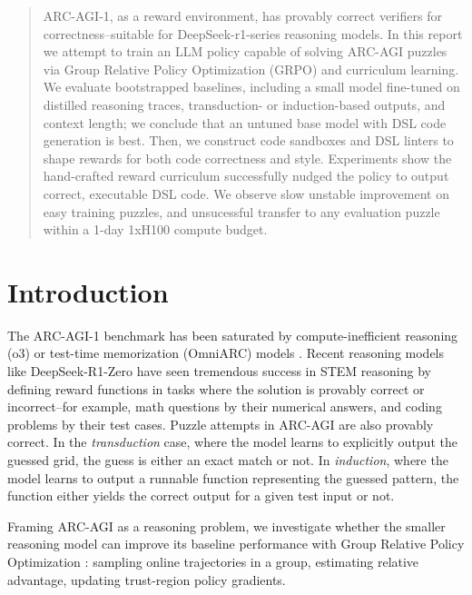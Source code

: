 \documentclass{article}
\begin{document}

\printAffiliationsAndNotice{}

\begin{abstract}
  ARC-AGI-1, as a reward environment, has provably correct verifiers for correctness--suitable for DeepSeek-r1-series reasoning models. In this report we attempt to train an LLM policy capable of solving ARC-AGI puzzles via Group Relative Policy Optimization (GRPO) and curriculum learning. We evaluate bootstrapped baselines, including a small model fine-tuned on distilled reasoning traces, transduction- or induction-based outputs, and context length; we conclude that an untuned base model with DSL code generation is best. Then, we construct code sandboxes and DSL linters to shape rewards for both code correctness and style. Experiments show the hand-crafted reward curriculum successfully nudged the policy to output correct, executable DSL code. We observe slow unstable improvement on easy training puzzles, and unsucessful transfer to any evaluation puzzle within a 1-day 1xH100 compute budget.
\end{abstract}

\section{Introduction}
The ARC-AGI-1 \cite{ARC-AGI} benchmark has been saturated by compute-inefficient reasoning (o3) or test-time memorization (OmniARC) models \cite{openai_openai_nodate} \cite{OmniARC}. Recent reasoning models like DeepSeek-R1-Zero  have seen tremendous success in STEM reasoning by defining reward functions in tasks where the solution is provably correct or incorrect--for example, math questions by their numerical answers, and coding problems by their test cases. Puzzle attempts in ARC-AGI are also provably correct. In the \textit{transduction} case, where the model learns to explicitly output the guessed grid, the guess is either an exact match or not. In \textit{induction}, where the model learns to output a runnable function representing the guessed pattern, the function either yields the correct output for a given test input or not.

Framing ARC-AGI as a reasoning problem, we investigate whether the smaller reasoning model  can improve its baseline performance with Group Relative Policy Optimization \cite{GRPO}: sampling online trajectories in a group, estimating relative advantage, updating trust-region policy gradients.
\end{document}
